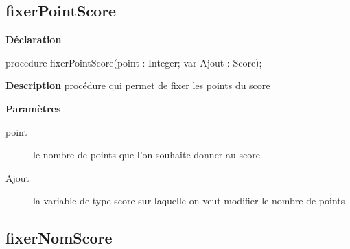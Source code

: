 \documentclass{report}
\newif\ifpdf
\begin{document}
\subsection*{fixerPointScore}
\fi
\label{Types-fixerPointScore}
\begin{list}{}{
\setlength{\itemindent}{0cm}
\setlength{\listparindent}{0cm}
\setlength{\leftmargin}{\evensidemargin}
\addtolength{\leftmargin}{\tmplength}
\settowidth{\labelsep}{X}
\addtolength{\leftmargin}{\labelsep}
\setlength{\labelwidth}{\tmplength}
}
\item[\textbf{Déclaration}\hfill]
\ifpdf
\begin{flushleft}
\fi
\begin{ttfamily}
procedure fixerPointScore(point : Integer; var Ajout : Score);\end{ttfamily}

\ifpdf
\end{flushleft}
\fi

\par
\item[\textbf{Description}]
procédure qui permet de fixer les points du score  \par
\item[\textbf{Paramètres}]
\begin{description}
\item[point] le nombre de points que l'on souhaite donner au score
\item[Ajout] la variable de type score sur laquelle on veut modifier le nombre de points
\end{description}


\end{list}
\ifpdf
\subsection*{\large{\textbf{fixerNomScore}}\normalsize\hspace{1ex}\hrulefill}
\else
\end{document}
